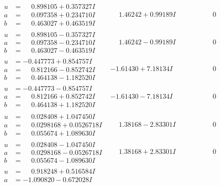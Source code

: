 \documentclass[1p]{elsarticle_modified}
\theoremstyle{definition}
\begin{document}
$$\begin{array}{c|c|c}
\begin{aligned}
u &= \phantom{-}0.898105 + 0.357327 I \\
a &= \phantom{-}0.097358 + 0.234710 I \\
b &= \phantom{-}0.463027 + 0.463519 I\end{aligned}
 & \phantom{-}1.46242 + 0.99189 I & \phantom{-0.000000 } 0 \\ \hline\begin{aligned}
u &= \phantom{-}0.898105 - 0.357327 I \\
a &= \phantom{-}0.097358 - 0.234710 I \\
b &= \phantom{-}0.463027 - 0.463519 I\end{aligned}
 & \phantom{-}1.46242 - 0.99189 I & \phantom{-0.000000 } 0 \\ \hline\begin{aligned}
u &= -0.447773 + 0.854757 I \\
a &= \phantom{-}0.812166 - 0.852742 I \\
b &= \phantom{-}0.464138 - 1.182520 I\end{aligned}
 & -1.61430 + 7.18134 I & \phantom{-0.000000 } 0 \\ \hline\begin{aligned}
u &= -0.447773 - 0.854757 I \\
a &= \phantom{-}0.812166 + 0.852742 I \\
b &= \phantom{-}0.464138 + 1.182520 I\end{aligned}
 & -1.61430 - 7.18134 I & \phantom{-0.000000 } 0 \\ \hline\begin{aligned}
u &= \phantom{-}0.028408 + 1.047450 I \\
a &= \phantom{-}0.0298168 + 0.0526718 I \\
b &= \phantom{-}0.055674 + 1.089630 I\end{aligned}
 & \phantom{-}1.38168 - 2.83301 I & \phantom{-0.000000 } 0 \\ \hline\begin{aligned}
u &= \phantom{-}0.028408 - 1.047450 I \\
a &= \phantom{-}0.0298168 - 0.0526718 I \\
b &= \phantom{-}0.055674 - 1.089630 I\end{aligned}
 & \phantom{-}1.38168 + 2.83301 I & \phantom{-0.000000 } 0 \\ \hline\begin{aligned}
u &= \phantom{-}0.918248 + 0.516584 I \\
a &= -1.090820 - 0.672028 I \\

\end{aligned}
\end{array}$$
\end{document}
